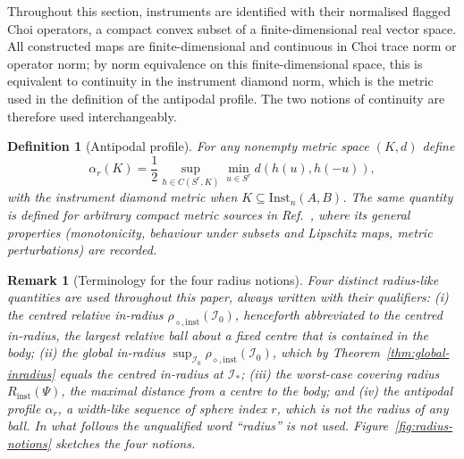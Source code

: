 \documentclass[11pt,a4paper]{article}
\newtheorem{definition}[theorem]{Definition}
\newtheorem{remark}[theorem]{Remark}
\newcommand{\Inst}{\mathrm{Inst}}
\begin{document}
Throughout this section, instruments are identified with their normalised flagged Choi operators, a compact convex subset of a finite-dimensional real vector space. All constructed maps are finite-dimensional and continuous in Choi trace norm or operator norm; by norm equivalence on this finite-dimensional space, this is equivalent to continuity in the instrument diamond norm, which is the metric used in the definition of the antipodal profile. The two notions of continuity are therefore used interchangeably.

\begin{definition}[Antipodal profile]
\label{def:alpha}
For any nonempty metric space $(K,d)$ define
\[
\alpha_r(K)=\frac12\sup_{h\in C(S^r,K)}\min_{u\in S^r}d(h(u),h(-u)),
\]
with the instrument diamond metric when $K\subseteq\Inst_n(A,B)$. The same quantity is defined for arbitrary compact metric sources in Ref.~\cite{CompanionChannels}, where its general properties (monotonicity, behaviour under subsets and Lipschitz maps, metric perturbations) are recorded.
\end{definition}

\begin{remark}[Terminology for the four radius notions]
\label{rem:radius-terminology}
Four distinct radius-like quantities are used throughout this paper, always written with their qualifiers: (i) the \emph{centred relative in-radius} $\rho_{\diamond,\mathrm{inst}}(\mathcal I_0)$, henceforth abbreviated to the centred in-radius, the largest relative ball about a fixed centre that is contained in the body; (ii) the \emph{global in-radius} $\sup_{\mathcal I_0}\rho_{\diamond,\mathrm{inst}}(\mathcal I_0)$, which by Theorem~\ref{thm:global-inradius} equals the centred in-radius at $\mathcal I_*$; (iii) the \emph{worst-case covering radius} $R_{\mathrm{inst}}(\Psi)$, the maximal distance from a centre to the body; and (iv) the \emph{antipodal profile} $\alpha_r$, a width-like sequence of sphere index $r$, which is not the radius of any ball. In what follows the unqualified word ``radius'' is not used. Figure~\ref{fig:radius-notions} sketches the four notions.
\end{remark}
\end{document}
